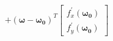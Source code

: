 \documentclass[preview]{standalone}
\begin{document}
\begin{align*}
+ (\mathbf{\omega} - \mathbf{\omega_0})^T\begin{bmatrix} f_x^{\prime}(\mathbf{\omega_0}) \\ f_y^{\prime}(\mathbf{\omega_0}) \end{bmatrix}
\end{align*}
\end{document}
